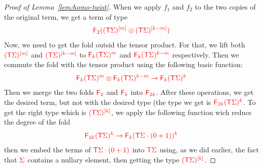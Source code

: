 \begin{proof}[Proof of Lemma~\ref{lem:homo-twist}]
When we apply $f_1$ and $f_2$ to the two copies of the original term, we get a term of type 
\begin{align*}
\ranked{ \reduce 2 (\mati m {(\tmonad \Sigma)}\otimes  \mati {k-m} {(\tmonad\Sigma)})}
\end{align*}
Now, we need to get the fold outsid the tensor product. For that, we lift both $\ranked{\mati m {(\tmonad \Sigma)}}$ and $\ranked{\mati {k-m} {(\tmonad \Sigma)}}$ to $\ranked{\reduce k (\tmonad \Sigma)^m}$ and $\ranked{\reduce k (\tmonad \Sigma)^{k-m}}$ respectively. Then we commute the fold with the tensor product using the following basic function:
\begin{align*}
\ranked{\reduce k (\tmonad \Sigma)^m\otimes\reduce k (\tmonad \Sigma)^{k-m}\to \reduce k (\tmonad \Sigma)^k}
\end{align*}
Then we merge the two  folds $\reduce 2$ and $\reduce k$ into $\reduce {2k}$. After these operations, we get the desired term, but not with the desired type (the type we get is $\ranked{\reduce {2k} (\tmonad\Sigma)^k}$. To get the right type which is $\ranked{\mati k {(\tmonad\Sigma)}}$, we apply the following function wich reducs the degree of the fold
\begin{align*}
\ranked{\reduce {2k} (\tmonad \Sigma)^k \to \reduce {k} (\tmonad \Sigma\cdot(0+1))^k}
 \end{align*}
then we embed the terms of $\ranked{\tmonad \Sigma\cdot(0+1)}$ into $\ranked{\tmonad \Sigma}$ using, as we did earlier, the fact that $\rSigma$ contains a nullary element, then getting the type $\ranked{\mati k {(\tmonad\Sigma)}}$.


\end{proof}

